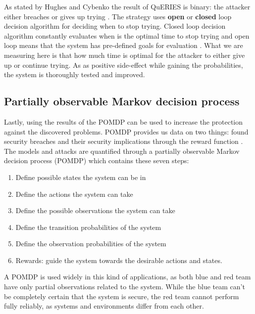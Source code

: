 As stated by Hughes and Cybenko the result of QuERIES is binary: the attacker either
breaches or gives up trying \cite{hughes2013quantitative}. The
strategy uses \textbf{open} or \textbf{closed} loop decision algorithm
for deciding when to stop trying. Closed loop decision algorithm
constantly evaluates when is the optimal time to stop trying and open
loop means that the system has pre-defined goals for evaluation
\cite{carin2008cybersecurity}. What we are measuring here is that how
much time is optimal for the attacker to either give up or continue
trying. As as positive side-effect while gaining the probabilities,
the system is thoroughly tested and improved.

\subsection{Partially observable Markov decision process}

Lastly, using the results of the POMDP can be used to increase the
protection against the discovered problems. POMDP provides us data on
two things: found security breaches and their security implications
through the reward function \cite{carin2008cybersecurity}. 
The models and attacks are quantified through a partially observable
Markov decision process (POMDP) which contains these seven steps:

\begin{enumerate}
    \item Define possible states the system can be in
    \item Define the actions the system can take
    \item Define the possible observations the system can take
    \item Define the transition probabilities of the system
    \item Define the observation probabilities of the system
    \item Rewards: guide the system towards the desirable actions and
      states.
\end{enumerate} \cite{hughes2013quantitative}

A POMDP is used widely in this kind of applications, as both blue and
red team have only partial observations related to the system. While
the blue team can't be completely certain that the system is secure,
the red team cannot perform fully reliably, as systems and
environments differ from each other. \cite{mcabeeMarkov}
